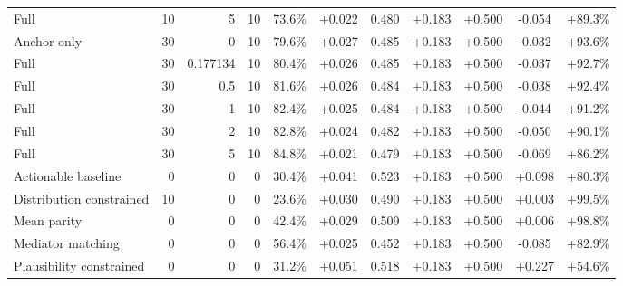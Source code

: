 \begin{table}[htbp]
\begin{tabular}{lrrrccccccc}
Full & 10 & 5 & 10 & 73.6\% & +0.022 & 0.480 & +0.183 & +0.500 & -0.054 & +89.3\% \\
Anchor only & 30 & 0 & 10 & 79.6\% & +0.027 & 0.485 & +0.183 & +0.500 & -0.032 & +93.6\% \\
Full & 30 & 0.177134 & 10 & 80.4\% & +0.026 & 0.485 & +0.183 & +0.500 & -0.037 & +92.7\% \\
Full & 30 & 0.5 & 10 & 81.6\% & +0.026 & 0.484 & +0.183 & +0.500 & -0.038 & +92.4\% \\
Full & 30 & 1 & 10 & 82.4\% & +0.025 & 0.484 & +0.183 & +0.500 & -0.044 & +91.2\% \\
Full & 30 & 2 & 10 & 82.8\% & +0.024 & 0.482 & +0.183 & +0.500 & -0.050 & +90.1\% \\
Full & 30 & 5 & 10 & 84.8\% & +0.021 & 0.479 & +0.183 & +0.500 & -0.069 & +86.2\% \\
Actionable baseline & 0 & 0 & 0 & 30.4\% & +0.041 & 0.523 & +0.183 & +0.500 & +0.098 & +80.3\% \\
Distribution constrained & 10 & 0 & 0 & 23.6\% & +0.030 & 0.490 & +0.183 & +0.500 & +0.003 & +99.5\% \\
Mean parity & 0 & 0 & 0 & 42.4\% & +0.029 & 0.509 & +0.183 & +0.500 & +0.006 & +98.8\% \\
Mediator matching & 0 & 0 & 0 & 56.4\% & +0.025 & 0.452 & +0.183 & +0.500 & -0.085 & +82.9\% \\
Plausibility constrained & 0 & 0 & 0 & 31.2\% & +0.051 & 0.518 & +0.183 & +0.500 & +0.227 & +54.6\% \\
\bottomrule
\end{tabular}
\end{table}